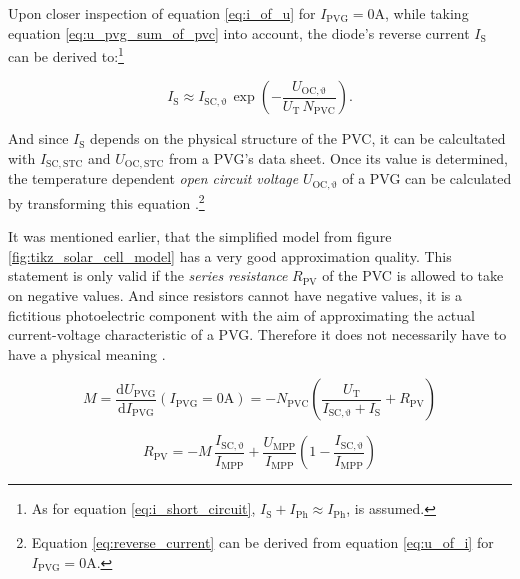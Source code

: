 Upon closer inspection of equation \ref{eq:i_of_u} for $I_{\mathrm{PVG}} = 0\mathrm{A}$, while taking equation \ref{eq:u_pvg_sum_of_pvc} into account, the diode's reverse current $I_{\mathrm{S}}$ can be derived to:\footnote{As for equation \ref{eq:i_short_circuit}, $I_{\mathrm{S}} + I_{\mathrm{Ph}} \approx I_{\mathrm{Ph}}$, is assumed.}
\begin{center}
	\begin{equation} \label{eq:reverse_current}
		I_{\mathrm{S}} \approx I_{\mathrm{SC, \vartheta}} \, \exp \left(-\frac{U_{\mathrm{OC, \vartheta}}}{U_{\mathrm{T}} \, N_{\mathrm{PVC}}}\right) \text{.}
	\end{equation}
\end{center}
And since $I_{\mathrm{S}}$ depends on the physical structure of the PVC, it can be calcultated with $I_{\mathrm{SC,STC}}$ and $U_{\mathrm{OC,STC}}$ from a PVG's data sheet. Once its value is determined, the temperature dependent \emph{open circuit voltage} $U_{\mathrm{OC,\vartheta}}$ of a PVG can be calculated by transforming this equation \cite{Mertens:2015, Wagner:2018}.\footnote{Equation \ref{eq:reverse_current} can be derived from equation \ref{eq:u_of_i} for $I_{\mathrm{PVG}} = 0\mathrm{A}$.}

It was mentioned earlier, that the simplified model from figure \ref{fig:tikz_solar_cell_model} has a very good approximation quality. This statement is only valid if the \emph{series resistance} $R_{\mathrm{PV}}$ of the PVC is allowed to take on negative values. And since resistors cannot have negative values, it is a fictitious photoelectric component with the aim of approximating the actual current-voltage characteristic of a PVG. Therefore it does not necessarily have to have a physical meaning \cite{Wagner:2018}.

\begin{center}
	\begin{equation} \label{eq:d_U_to_d_I}
		M = \frac{\mathrm{d} U_{\mathrm{PVG}}}{\mathrm{d} I_{\mathrm{PVG}}}\left(I_{\mathrm{PVG}} = 0\mathrm{A}\right) = - N_{\mathrm{PVC}} \left( \frac{U_{\mathrm{T}}}{I_{\mathrm{SC, \vartheta}} + I_{\mathrm{S}}} + R_{\mathrm{PV}} \right)
	\end{equation}
\end{center}

\begin{center}
	\begin{equation} \label{eq:r_pv_with_M}
		R_{\mathrm{PV}} = - M \, \frac{I_{\mathrm{SC, \vartheta}}}{I_{\mathrm{MPP}}} + \frac{U_{\mathrm{MPP}}}{I_{\mathrm{MPP}}} \left(1 - \frac{I_{\mathrm{SC, \vartheta}}}{I_{\mathrm{MPP}}} \right) 
	\end{equation}
\end{center}

